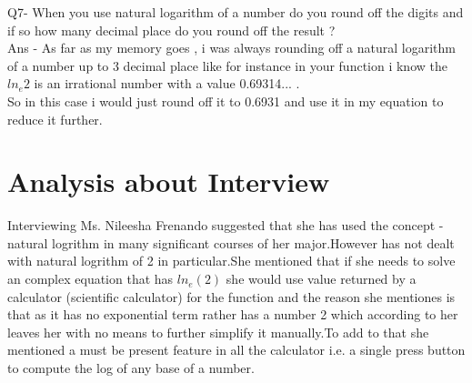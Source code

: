 \documentclass{article}
\begin{document}
Q7- When you use natural logarithm of a number do you round off the digits and if so how many decimal place do you round off the result ?\\ 
Ans - As far as my memory goes , i was always rounding off a natural logarithm of a number up to 3 decimal place like for instance in your function i know the 
$ln_{e} 2$ is an irrational number with a value 0.69314... .\\
So in this case i would just round off it to 0.6931 and use it in my equation to reduce it further.

\section{Analysis about Interview}
Interviewing Ms. Nileesha Frenando suggested that she has used the concept - natural logrithm in many significant courses of her major.However has not dealt with natural logrithm of 2 in particular.She mentioned that if she needs to solve an complex equation that has $ln_{e}(2)$ she would use value returned by a calculator (scientific calculator) for the function and the reason she mentiones is that as it has no exponential term rather has a number 2 which according to her leaves her with no means to further simplify it manually.To add to that she mentioned a must be present feature in all the calculator i.e. a single press button to compute the log of any base of a number.
\end{document}
